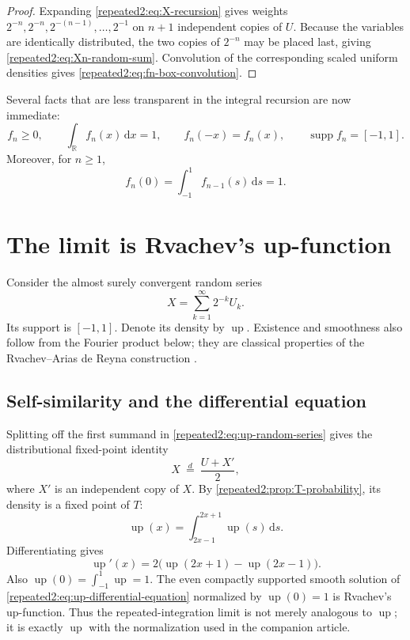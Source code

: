 \documentclass[11pt,oneside]{article}
\theoremstyle{definition}
\theoremstyle{remark}
\newcommand{\R}{\mathbb R}
\newcommand{\Up}{\operatorname{up}}
\newcommand{\dd}{\,\mathrm d}
\newcommand{\supp}{\operatorname{supp}}
\begin{document}
\begin{proof}
Expanding \eqref{repeated2:eq:X-recursion} gives weights
$2^{-n},2^{-n},2^{-(n-1)},\ldots,2^{-1}$ on $n+1$ independent copies of $U$.
Because the variables are identically distributed, the two copies of $2^{-n}$ may be
placed last, giving \eqref{repeated2:eq:Xn-random-sum}.  Convolution of the corresponding scaled
uniform densities gives \eqref{repeated2:eq:fn-box-convolution}.
\end{proof}

Several facts that are less transparent in the integral recursion are now immediate:
\begin{equation}
 f_n\ge0,
 \qquad \int_{\R}f_n(x)\dd x=1,
 \qquad f_n(-x)=f_n(x),
 \qquad \supp f_n=[-1,1].
 \label{repeated2:eq:basic-fn-properties}
\end{equation}
Moreover, for $n\ge1$,
\begin{equation}
 f_n(0)=\int_{-1}^{1}f_{n-1}(s)\dd s=1.
 \label{repeated2:eq:fn-zero-one}
\end{equation}

\section{The limit is Rvachev's up-function}
\label{repeated2:sec:limit-identification}

Consider the almost surely convergent random series
\begin{equation}
 X=\sum_{k=1}^{\infty}2^{-k}U_k.
 \label{repeated2:eq:up-random-series}
\end{equation}
Its support is $[-1,1]$.  Denote its density by $\Up$.  Existence and smoothness also follow
from the Fourier product below; they are classical properties of the Rvachev--Arias de
Reyna construction \cite{repeated2:arias1982}.

\subsection{Self-similarity and the differential equation}

Splitting off the first summand in \eqref{repeated2:eq:up-random-series} gives the distributional
fixed-point identity
\begin{equation}
 X\ \stackrel{d}{=}\ \frac{U+X'}2,
 \label{repeated2:eq:up-fixed-point-random}
\end{equation}
where $X'$ is an independent copy of $X$.  By \cref{repeated2:prop:T-probability}, its density is a
fixed point of $T$:
\begin{equation}
 \Up(x)=\int_{2x-1}^{2x+1}\Up(s)\dd s.
 \label{repeated2:eq:up-fixed-point-integral}
\end{equation}
Differentiating gives
\begin{equation}
 \Up'(x)=2\bigl(\Up(2x+1)-\Up(2x-1)\bigr).
 \label{repeated2:eq:up-differential-equation}
\end{equation}
Also $\Up(0)=\int_{-1}^{1}\Up=1$.  The even compactly supported smooth solution of
\eqref{repeated2:eq:up-differential-equation} normalized by $\Up(0)=1$ is Rvachev's up-function.
Thus the repeated-integration limit is not merely analogous to $\Up$; it is exactly $\Up$
with the normalization used in the companion article.
\end{document}
